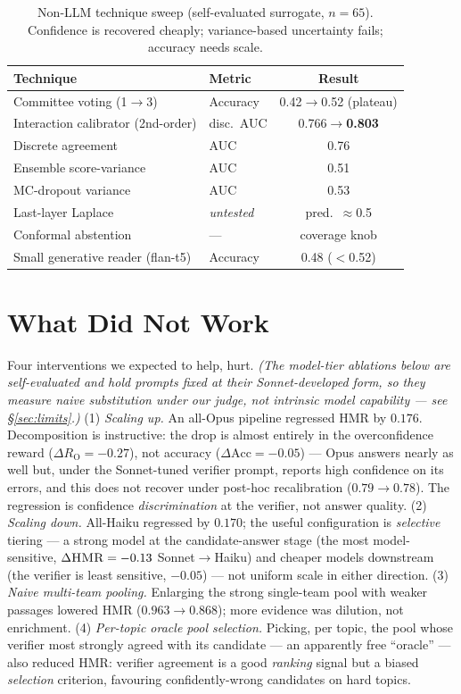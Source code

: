 \documentclass[sigconf,nonacm]{acmart}
\newcommand{\HMR}{\textsc{HMR}}
\newcommand{\RO}{R_{\mathrm{O}}}
\begin{document}
\begin{table}[t]
\centering\small
\caption{Non-LLM technique sweep (self-evaluated surrogate, $n{=}65$). Confidence is
recovered cheaply; variance-based uncertainty fails; accuracy needs scale.}
\label{tab:sweep}
\begin{tabular}{llc}
\toprule
Technique & Metric & Result \\
\midrule
Committee voting (1$\to$3) & Accuracy & 0.42$\to$0.52 (plateau) \\
Interaction calibrator (2nd-order) & disc.\ AUC & 0.766$\to$\textbf{0.803} \\
Discrete agreement & AUC & 0.76 \\
Ensemble score-variance & AUC & 0.51 \\
MC-dropout variance & AUC & 0.53 \\
Last-layer Laplace & \emph{untested} & pred.\ $\approx$0.5 \\
Conformal abstention & --- & coverage knob \\
Small generative reader (flan-t5) & Accuracy & 0.48 ($<$0.52) \\
\bottomrule
\end{tabular}
\end{table}

\section{What Did Not Work}
\label{sec:negative}
Four interventions we expected to help, hurt. \emph{(The model-tier ablations below are
self-evaluated and hold prompts fixed at their Sonnet-developed form, so they measure naive
substitution under our judge, not intrinsic model capability --- see \S\ref{sec:limits}.)}
(1) \emph{Scaling up.} An all-Opus pipeline regressed \HMR{} by $0.176$. Decomposition is
instructive: the drop is almost entirely in the overconfidence reward ($\Delta\RO{=}{-}0.27$),
not accuracy ($\Delta\text{Acc}{=}{-}0.05$) --- Opus answers nearly as well but, under the
Sonnet-tuned verifier prompt, reports high confidence on its errors, and this does not
recover under post-hoc recalibration ($0.79\!\to\!0.78$). The regression is confidence
\emph{discrimination} at the verifier, not answer quality.
(2) \emph{Scaling down.} All-Haiku regressed by $0.170$; the useful configuration is
\emph{selective} tiering --- a strong model at the candidate-answer stage (the most
model-sensitive, $\Delta\HMR=-0.13$ Sonnet$\to$Haiku) and cheaper models downstream (the
verifier is least sensitive, $-0.05$) --- not uniform scale in either direction.
(3) \emph{Naive multi-team pooling.} Enlarging the strong single-team pool with weaker
passages lowered \HMR{} ($0.963\!\to\!0.868$); more evidence was dilution, not enrichment.
(4) \emph{Per-topic oracle pool selection.} Picking, per topic, the pool whose verifier
most strongly agreed with its candidate --- an apparently free ``oracle'' --- also reduced
\HMR: verifier agreement is a good \emph{ranking} signal but a biased \emph{selection}
criterion, favouring confidently-wrong candidates on hard topics.
\end{document}

